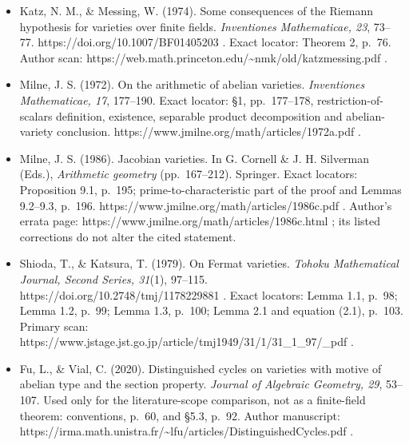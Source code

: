 \begin{itemize}
\tightlist
\item
  Katz, N. M., \& Messing, W. (1974). Some consequences of the Riemann
  hypothesis for varieties over finite fields. \emph{Inventiones
  Mathematicae, 23}, 73--77. https://doi.org/10.1007/BF01405203 . Exact
  locator: Theorem 2, p.~76. Author scan:
  https://web.math.princeton.edu/\textasciitilde nmk/old/katzmessing.pdf
  .
\item
  Milne, J. S. (1972). On the arithmetic of abelian varieties.
  \emph{Inventiones Mathematicae, 17}, 177--190. Exact locator: §1,
  pp.~177--178, restriction-of-scalars definition, existence, separable
  product decomposition and abelian-variety conclusion.
  https://www.jmilne.org/math/articles/1972a.pdf .
\item
  Milne, J. S. (1986). Jacobian varieties. In G. Cornell \& J. H.
  Silverman (Eds.), \emph{Arithmetic geometry} (pp.~167--212). Springer.
  Exact locators: Proposition 9.1, p.~195; prime-to-characteristic part
  of the proof and Lemmas 9.2--9.3, p.~196.
  https://www.jmilne.org/math/articles/1986c.pdf . Author's errata page:
  https://www.jmilne.org/math/articles/1986c.html ; its listed
  corrections do not alter the cited statement.
\item
  Shioda, T., \& Katsura, T. (1979). On Fermat varieties. \emph{Tohoku
  Mathematical Journal, Second Series, 31}(1), 97--115.
  https://doi.org/10.2748/tmj/1178229881 . Exact locators: Lemma 1.1,
  p.~98; Lemma 1.2, p.~99; Lemma 1.3, p.~100; Lemma 2.1 and equation
  (2.1), p.~103. Primary scan:
  https://www.jstage.jst.go.jp/article/tmj1949/31/1/31\_1\_97/\_pdf .
\item
  Fu, L., \& Vial, C. (2020). Distinguished cycles on varieties with
  motive of abelian type and the section property. \emph{Journal of
  Algebraic Geometry, 29}, 53--107. Used only for the literature-scope
  comparison, not as a finite-field theorem: conventions, p.~60, and
  §5.3, p.~92. Author manuscript:
  https://irma.math.unistra.fr/\textasciitilde lfu/articles/DistinguishedCycles.pdf
  .
\end{itemize}
